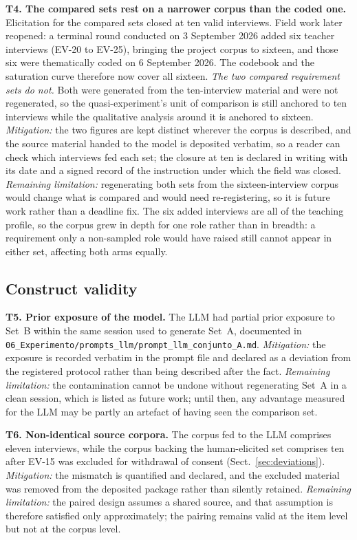 \documentclass{llncs}
\begin{document}
\textbf{T4. The compared sets rest on a narrower corpus than the coded one.} Elicitation
for the compared sets closed at ten valid interviews. Field work later reopened: a
terminal round conducted on 3 September 2026 added six teacher interviews (EV-20 to
EV-25), bringing the project corpus to sixteen, and those six were thematically coded on
6 September 2026. The codebook and the saturation curve therefore now cover all sixteen.
\emph{The two compared requirement sets do not.} Both were generated from the ten-interview
material and were not regenerated, so the quasi-experiment's unit of comparison is still
anchored to ten interviews while the qualitative analysis around it is anchored to sixteen.
\emph{Mitigation:} the two figures are kept distinct wherever the corpus is described, and
the source material handed to the model is deposited verbatim, so a reader can check which
interviews fed each set; the closure at ten is declared in writing with its date and a
signed record of the instruction under which the field was closed.
\emph{Remaining limitation:} regenerating both sets from the sixteen-interview corpus
would change what is compared and would need re-registering, so it is future work rather
than a deadline fix. The six added interviews are all of the teaching profile, so the
corpus grew in depth for one role rather than in breadth: a requirement only a non-sampled
role would have raised still cannot appear in either set, affecting both arms equally.

\subsection{Construct validity}

\textbf{T5. Prior exposure of the model.} The LLM had partial prior exposure to
Set~B within the same session used to generate Set~A, documented in
\texttt{06\_Experimento/prompts\_llm/prompt\_llm\_conjunto\_A.md}.
\emph{Mitigation:} the exposure is recorded verbatim in the prompt file and
declared as a deviation from the registered protocol rather than being described
after the fact. \emph{Remaining limitation:} the contamination cannot be undone
without regenerating Set~A in a clean session, which is listed as future work;
until then, any advantage measured for the LLM may be partly an artefact of
having seen the comparison set.

\textbf{T6. Non-identical source corpora.} The corpus fed to the LLM comprises
eleven interviews, while the corpus backing the human-elicited set comprises ten
after EV-15 was excluded for withdrawal of consent (Sect.~\ref{sec:deviations}).
\emph{Mitigation:} the mismatch is quantified and declared, and the excluded
material was removed from the deposited package rather than silently retained.
\emph{Remaining limitation:} the paired design assumes a shared source, and that
assumption is therefore satisfied only approximately; the pairing remains valid
at the item level but not at the corpus level.
\end{document}
